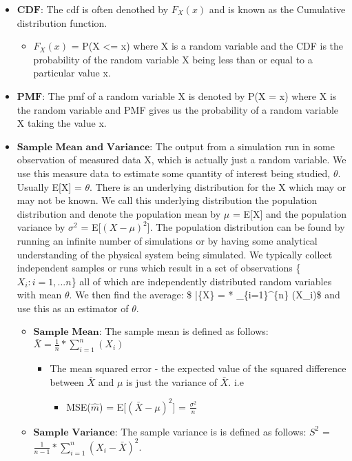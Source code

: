 \documentclass[11pt]{article}
\providecommand{\tightlist}{%
      \setlength{\itemsep}{0pt}\setlength{\parskip}{0pt}}
\begin{document}
\begin{itemize}
\item
  \(\textbf{CDF}\): The cdf is often denothed by \(F_{X}(x)\) and is
  known as the Cumulative distribution function.

  \begin{itemize}
  \tightlist
  \item
    \(F_{X}(x)\) = P(X \textless{}= x) where X is a random variable and
    the CDF is the probability of the random variable X being less than
    or equal to a particular value x.
  \end{itemize}
\item
  \(\textbf{PMF}\): The pmf of a random variable X is denoted by P(X =
  x) where X is the random variable and PMF gives us the probability of
  a random variable X taking the value x.
\item
  \(\textbf{Sample Mean and Variance}\): The output from a simulation
  run in some observation of measured data X, which is actually just a
  random variable. We use this measure data to estimate some quantity of
  interest being studied, \(\theta\). Usually E{[}X{]} = \(\theta\).
  There is an underlying distribution for the X which may or may not be
  known. We call this underlying distribution the population
  distribution and denote the population mean by \(\mu\) = E{[}X{]} and
  the population variance by \(\sigma^2\) = E{[}\((X - \mu)^2\){]}. The
  population distribution can be found by running an infinite number of
  simulations or by having some analytical understanding of the physical
  system being simulated. We typically collect independent samples or
  runs which result in a set of observations \{\(X_i : i = 1,...n\)\}
  all of which are independently distributed random variables with mean
  \(\theta\). We then find the average: \$ \bar\{X\} =  *
  \sum\_\{i=1\}\^{}\{n\} (X\_i)\$ and use this as an estimator of
  \(\theta\).

  \begin{itemize}
  \item
    \(\textbf{Sample Mean}\): The sample mean is defined as follows:
    \(\bar{X} = \frac{1}{n} * \sum_{i=1}^{n} (X_i)\)

    \begin{itemize}
    \item
      The mean squared error - the expected value of the squared
      difference between \(\bar{X}\) and \(\mu\) is just the variance of
      \(\bar{X}\). i.e

      \begin{itemize}
      \tightlist
      \item
        MSE(\(\hat{m}\)) = E{[}\((\bar{X} - \mu)^2\){]} =
        \(\frac{\sigma^2}{n}\)
      \end{itemize}
    \end{itemize}
  \item
    \(\textbf{Sample Variance}\): The sample variance is is defined as
    follows: \(S^2\) =
    \(\frac{1}{n-1} * \sum_{i=1}^{n} (X_i - \bar{X})^2\).


\end{itemize}
\end{itemize}
\end{document}
